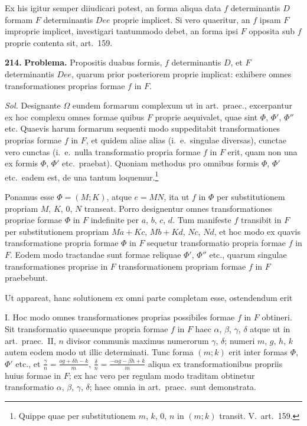 \documentclass[12pt,a4paper]{article}
\theoremstyle{plain}
\theoremstyle{definition}
\theoremstyle{remark}
\begin{document}
Ex his igitur semper diiudicari potest, an forma aliqua data $f$ determinantis $D$ formam $F$ determinantis $Dee$ proprie implicet. Si vero quaeritur, an $f$ ipsam $F$ improprie implicet, investigari tantummodo debet, an forma ipsi $F$ opposita sub $f$ proprie contenta sit, art.\ 159.

\textbf{214.}
\textbf{Problema.}
Propositis duabus formis, $f$ determinantis $D$, et $F$ determinantis $Dee$, quarum prior posteriorem proprie implicat: exhibere omnes transformationes proprias formae $f$ in $F$.

\textit{Sol.}
Designante $\Omega$ eundem formarum complexum ut in art.\ praec., excerpantur ex hoc complexu omnes formae quibus $F$ proprie aequivalet, quae sint $\Phi$, $\Phi'$, $\Phi''$ etc. Quaevis harum formarum sequenti modo suppeditabit transformationes proprias formae $f$ in $F$, et quidem aliae alias (i.\ e.\ singulae diversas), cunctae vero cunctas (i.\ e.\ nulla transformatio propria formae $f$ in $F$ erit, quam non una ex formis $\Phi$, $\Phi'$ etc.\ praebat). Quoniam methodus pro omnibus formis $\Phi$, $\Phi'$ etc.\ eadem est, de una tantum loquemur.\footnote{Quippe quae per substitutionem $m$, $k$, $0$, $n$ in $(m;k)$ transit. V.\ art.\ 159.}

Ponamus esse $\Phi=(M;K)$, atque $e=MN$, ita ut $f$ in $\Phi$ per substitutionem propriam $M$, $K$, $0$, $N$ transeat. Porro designentur omnes transformationes propriae formae $\Phi$ in $F$ indefinite per $a$, $b$, $c$, $d$. Tum manifeste $f$ transibit in $F$ per substitutionem propriam $Ma+Kc$, $Mb+Kd$, $Nc$, $Nd$, et hoc modo ex quavis transformatione propria formae $\Phi$ in $F$ sequetur transformatio propria formae $f$ in $F$. Eodem modo tractandae sunt formae reliquae $\Phi'$, $\Phi''$ etc., quarum singulae transformationes propriae in $F$ transformationem propriam formae $f$ in $F$ praebebunt.

Ut appareat, hanc solutionem ex omni parte completam esse, ostendendum erit

I. Hoc modo omnes transformationes proprias possibiles formae $f$ in $F$ obtineri. Sit transformatio quaecunque propria formae $f$ in $F$ haec $\alpha$, $\beta$, $\gamma$, $\delta$ atque ut in art.\ praec.\ II, $n$ divisor communis maximus numerorum $\gamma$, $\delta$; numeri $m$, $g$, $h$, $k$ autem eodem modo ut illic determinati. Tunc forma $(m;k)$ erit inter formas $\Phi$, $\Phi'$ etc., et $\frac{\gamma}{n}=\frac{og+\delta h-k}{m}$, $\frac{\delta}{n}=\frac{-\alpha g-\beta h+k}{m}$ aliqua ex transformationibus propriis huius formae in $F$; ex hac vero per regulam modo traditam obtinetur transformatio $\alpha$, $\beta$, $\gamma$, $\delta$; haec omnia in art.\ praec.\ sunt demonstrata.
\end{document}
